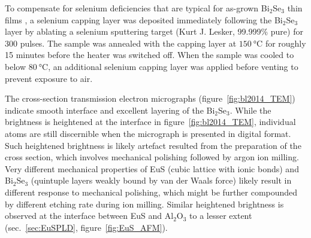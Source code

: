 To compensate for selenium deficiencies that are typical for as-grown Bi$_2$Se$_3$ thin films \cite{Zhanybek3, zhangli2012, zhangli2013, TI_ARPES1, ARPES_thickness}, a selenium capping layer was deposited immediately following the Bi$_2$Se$_3$ layer by ablating a selenium sputtering target (Kurt J. Lesker, 99.999\% pure) for 300 pulses. The sample was annealed with the capping layer at $\SI{150}{\degreeCelsius}$ for roughly 15 minutes before the heater was switched off. When the sample was cooled to below $\SI{80}{\degreeCelsius}$, an additional selenium capping layer was applied before venting to prevent exposure to air.

The cross-section transmission electron micrographs (figure~\ref{fig:bl2014_TEM}) indicate smooth interface and excellent layering of the Bi$_2$Se$_3$. While the brightness is heightened at the interface in figure~\ref{fig:bl2014_TEM}, individual atoms are still discernible when the micrograph is presented in digital format. Such heightened brightness is likely artefact resulted from the preparation of the cross section, which involves mechanical polishing followed by argon ion milling. Very different mechanical properties of EuS (cubic lattice with ionic bonds) and Bi$_2$Se$_3$ (quintuple layers weakly bound by van der Waals force) likely result in different response to mechanical polishing, which might be further compounded by different etching rate during ion milling. Similar heightened brightness is observed at the interface between EuS and Al$_2$O$_3$ to a lesser extent (sec.~\ref{sec:EuSPLD}, figure~\ref{fig:EuS_AFM}).

